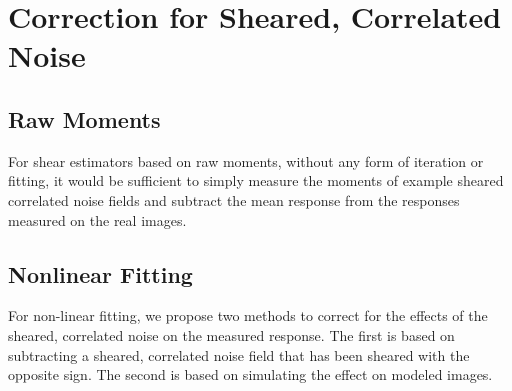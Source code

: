\documentclass[usegraphicx,usenatbib]{mn2e}
\begin{document}
\begin{comment}
\subsection{Expected Level of Contamination}

I think the following is not correct.

The correlated noise is produced by de-convolving and re-convolving by the psf,
so it may be correlated with the PSF ellipticity at some level.  Let's assume
the induced ellipticity is $f \times e^{PSF}$ in the absence of shearing, with
$f$ small.  We expect this to cancel in the response calculation, due to the
subtraction, but add to the estimator $E$.  This should, however, be
partly dealt with by subtracting $R^{PSF}$ (see below).

If we introduce shearing, then the sheared noise will cancel in the estimator
$E$ but not the response.

This sheared part of the correlated noise is suppressed by a factor of
$\gamma$, but in forming the derivative another factor of $1/\gamma$ is
applied.  Thus we expect the overall contamination $R_\eta$ to be of
the order $f \times e^{PSF}$.

\end{comment}

\section{Correction for Sheared, Correlated Noise} \label{sec:corr}

\subsection{Raw Moments}

For shear estimators based on raw moments, without any form of iteration or
fitting, it would be sufficient to simply measure the moments of example
sheared correlated noise fields and subtract the mean response from the
responses measured on the real images.

\subsection{Nonlinear Fitting}

For non-linear fitting, we propose two methods to correct for the effects of
the sheared, correlated noise on the measured response.  The first is based on
subtracting a sheared, correlated noise field that has been sheared with the
opposite sign.  The second is based on simulating the effect on modeled images.
\end{document}
